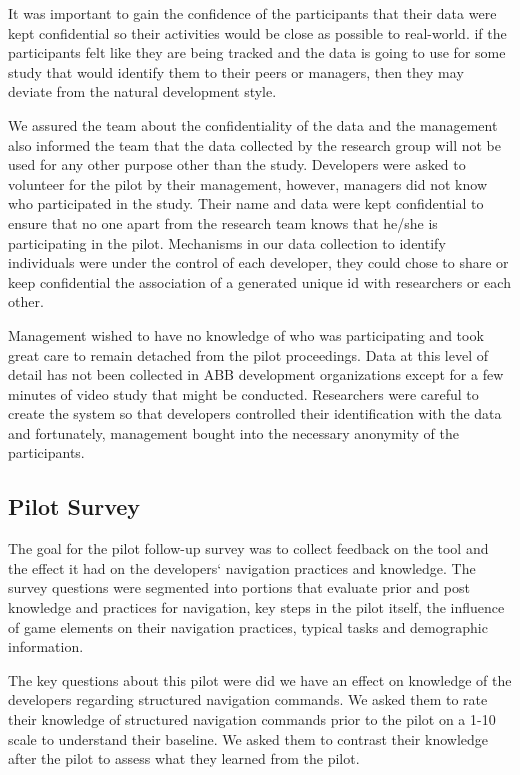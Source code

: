 \documentclass{sig-alternate}
\begin{document}
It was important to gain the confidence of the participants that their data were kept confidential so their activities would be close as possible to real-world. if the participants felt like they are being tracked and the data is going to use for some study that would identify them to their peers or managers, then they may deviate from the natural development style.

We  assured the team about the confidentiality of the data and the management also informed the team that the data collected by the research group will not be used for any other purpose other than the study.  Developers were asked to volunteer for the pilot by their management, however, managers did not know who participated in the study. Their name and data were kept confidential to ensure that no one apart from the research team knows that he/she is participating in the pilot. Mechanisms in our data collection to identify individuals were under the control of each developer, they could chose to share or keep confidential the association of a generated unique id with researchers or each other.   

Management wished to have no knowledge of who was participating and took great care to remain detached from the pilot proceedings.  Data at this level of detail has not been collected in ABB development organizations except for a few minutes of video study that might be conducted.  Researchers were careful to create the system so that developers controlled their identification with the data and fortunately, management bought into the necessary anonymity of the participants.
\subsection{Pilot Survey}

The goal for the pilot follow-up survey was to collect feedback on the tool and the effect it had on the developers` navigation practices and knowledge.  The survey questions were segmented into portions that evaluate prior and post knowledge and practices for navigation, key steps in the pilot itself, the influence of game elements on their navigation practices, typical tasks and demographic information.

The key questions about this pilot were did we have an effect on knowledge of the developers regarding structured navigation commands.  We asked them to rate their knowledge of structured navigation commands prior to the pilot on a 1-10 scale to understand their baseline.  We asked them to contrast their knowledge after the pilot to assess what they learned from the pilot.
\end{document}
